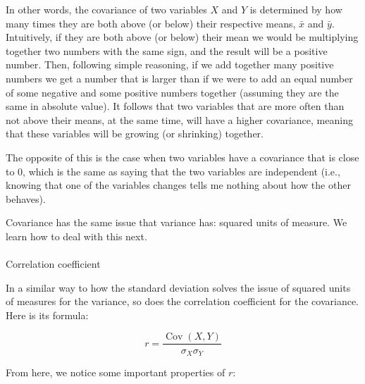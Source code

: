 \documentclass[
  letterpaper,
  DIV=11,
  numbers=noendperiod]{scrartcl}
\makeatletter
\let\oldparagraph\paragraph
\renewcommand{\paragraph}{
    \@ifstar
      \xxxParagraphStar
      \xxxParagraphNoStar
  }
\newcommand{\xxxParagraphStar}[1]{\oldparagraph*{#1}\mbox{}}
\newcommand{\xxxParagraphNoStar}[1]{\oldparagraph{#1}\mbox{}}
\makeatother
\begin{document}
In other words, the covariance of two variables \(X\) and \(Y\) is
determined by how many times they are both above (or below) their
respective means, \(\bar{x}\) and \(\bar{y}\). Intuitively, if they are
both above (or below) their mean we would be multiplying together two
numbers with the same sign, and the result will be a positive number.
Then, following simple reasoning, if we add together many positive
numbers we get a number that is larger than if we were to add an equal
number of some negative and some positive numbers together (assuming
they are the same in absolute value). It follows that two variables that
are more often than not above their means, at the same time, will have a
higher covariance, meaning that these variables will be growing (or
shrinking) together.

The opposite of this is the case when two variables have a covariance
that is close to 0, which is the same as saying that the two variables
are independent (i.e., knowing that one of the variables changes tells
me nothing about how the other behaves).

\begin{tcolorbox}[enhanced jigsaw, colbacktitle=quarto-callout-caution-color!10!white, coltitle=black, leftrule=.75mm, colback=white, colframe=quarto-callout-caution-color-frame, rightrule=.15mm, opacitybacktitle=0.6, titlerule=0mm, arc=.35mm, toptitle=1mm, opacityback=0, bottomtitle=1mm, left=2mm, title=\textcolor{quarto-callout-caution-color}{\faFire}\hspace{0.5em}{Caution}, bottomrule=.15mm, breakable, toprule=.15mm]

Covariance has the same issue that variance has: squared units of
measure. We learn how to deal with this next.

\end{tcolorbox}

\paragraph{Correlation coefficient}\label{correlation-coefficient}

In a similar way to how the standard deviation solves the issue of
squared units of measures for the variance, so does the correlation
coefficient for the covariance. Here is its formula:

\[
r = \frac{\operatorname{Cov}(X, Y)}{\sigma_X \sigma_Y}
\]

From here, we notice some important properties of \(r\):
\end{document}
